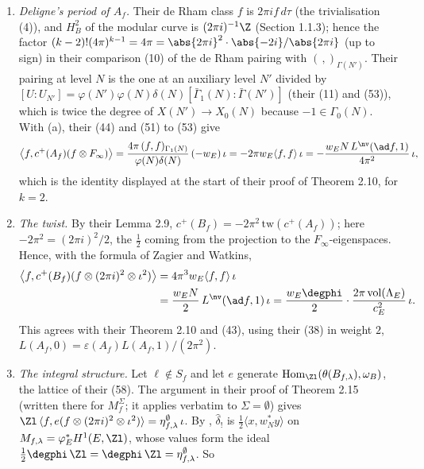 \begin{remark}
\begin{enumerate}[label=(\alph*)]
$(f,f)_{\Gamma_1(N)}=\delta(N)N\varphi(N)L^{\nv}(A_f,1)/(16\pi^3)$, is therefore exactly $\langle f,f\rangle=N\,L^{\nv}(\ad f,1)/(8\pi^3)$, and their naive factors (Section 1.7.2) are ours
factor by factor.
\item \emph{Deligne's period of $A_f$.} Their de Rham class $f$ is $2\pi if\,d\tau$ (the trivialisation (4)), and $H^2_B$ of the modular curve is $(2\pi i)^{-1}\Z$ (Section 1.1.3); hence the
factor $(k-2)!(4\pi)^{k-1}=4\pi=\abs{2\pi i}^2\cdot\abs{-2i}/\abs{2\pi i}$ (up to sign) in their comparison (10) of the de Rham pairing with $(\,,)_{\Gamma(N')}$. Their pairing at level $N$ is the one at an auxiliary
level $N'$ divided by $[U:U_{N'}]=\varphi(N')\varphi(N)\delta(N)[\bar\Gamma_1(N):\bar\Gamma(N')]$ (their (11) and (53)), which is twice the degree of $X(N')\to X_0(N)$ because $-1\in\Gamma_0(N)$. With
(a), their (44) and (51) to (53) give
\[
\bigl\langle f,c^+(A_f)(f\otimes F_\infty)\bigr\rangle=\frac{4\pi\,(f,f)_{\Gamma_1(N)}}{\varphi(N)\delta(N)}\,(-w_E)\,\iota=-2\pi w_E\langle f,f\rangle\,\iota=-\frac{w_EN\,L^{\nv}(\ad f,1)}{4\pi^2}\,\iota,
\]
which is the identity displayed at the start of their proof of Theorem 2.10, for $k=2$.
\item \emph{The twist.} By their Lemma 2.9, $c^+(B_f)=-2\pi^2\,\mathrm{tw}(c^+(A_f))$; here $-2\pi^2=(2\pi i)^2/2$, the $\frac12$ coming from the projection to the $F_\infty$-eigenspaces. Hence, with the
formula of Zagier and Watkins,
\begin{align*}
\bigl\langle f,c^+(B_f)(f\otimes(2\pi i)^2\otimes\iota^2)\bigr\rangle&=4\pi^3w_E\langle f,f\rangle\,\iota\\
&=\frac{w_EN}2\,L^{\nv}(\ad f,1)\,\iota=\frac{w_E\degphi}2\cdot\frac{2\pi\operatorname{vol}(\Lambda_E)}{c_E^2}\,\iota.
\end{align*}
This agrees with their Theorem 2.10 and (43), using their (38) in weight $2$, $L(A_f,0)=\varepsilon(A_f)L(A_f,1)/(2\pi^2)$.
\item \emph{The integral structure.} Let $\ell\notin S_f$ and let $e$ generate $\operatorname{Hom}_{\Zl}(\theta(B_{f,\lambda}),\omega_B)$, the lattice of their (58). The argument in their proof of
Theorem 2.15 (written there for $M_f^\Sigma$; it applies verbatim to $\Sigma=\emptyset$) gives $\Zl\,\langle f,e(f\otimes(2\pi i)^2\otimes\iota^2)\rangle=\eta^\emptyset_{f,\lambda}\,\iota$. By
, $\hat\delta_!$ is $\frac12\langle x,w_N^*y\rangle$ on $M_{f,\lambda}=\varphi_E^*H^1(E,\Zl)$, whose values form the ideal $\frac12\degphi\,\Zl=\degphi\,\Zl=\eta^\emptyset_{f,\lambda}$. So

\end{enumerate}
\end{remark}
